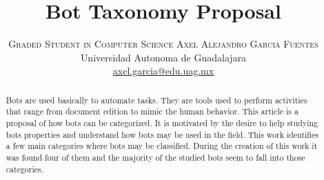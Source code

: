 \documentclass[twoside]{article}
\title{\vspace{-15mm}\fontsize{24pt}{10pt}\selectfont\textbf{Bot Taxonomy Proposal}} %
\author{
\large
\textsc{Graded Student in Computer Science Axel Alejandro Garcia Fuentes}\\[2mm] %
\normalsize Universidad Autonoma de Guadalajara \\ %
\normalsize \href{mailto:axel.garcia@edu.uag.mx}{axel.garcia@edu.uag.mx} %
\vspace{-5mm}
}
\date{}
\begin{document}
\maketitle %

\thispagestyle{fancy} %


\begin{abstract}

Bots are used basically to automate tasks. They are tools used to perform activities that range from document edition to mimic the human behavior.
This article is a proposal of how bots can be categorized. It is motivated by the desire to help studying bots properties and understand how bots may 
be used in the field. This work identifies a few main categories where bots may be classified. During the creation of this work it was found four of them and 
the majority of the studied bots seem to fall into those categories. 
\end{abstract}

\end{document}
